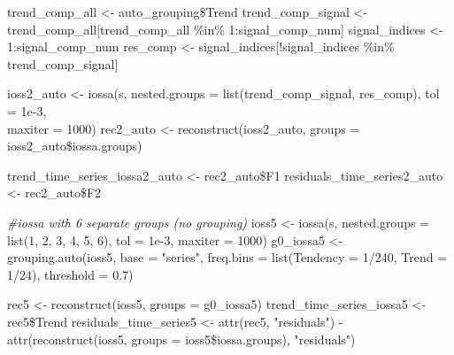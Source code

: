 \documentclass[specialist,
               substylefile = spbu_report.rtx,
               subf,href,colorlinks=true, 12pt]{disser}
\theoremstyle{definition}
\newenvironment{Shaded}{\begin{snugshade}}{\end{snugshade}}
\newcommand{\AttributeTok}[1]{\textcolor[rgb]{0.77,0.63,0.00}{#1}}
\newcommand{\CommentTok}[1]{\textcolor[rgb]{0.56,0.35,0.01}{\textit{#1}}}
\newcommand{\DecValTok}[1]{\textcolor[rgb]{0.00,0.00,0.81}{#1}}
\newcommand{\FloatTok}[1]{\textcolor[rgb]{0.00,0.00,0.81}{#1}}
\newcommand{\FunctionTok}[1]{\textcolor[rgb]{0.00,0.00,0.00}{#1}}
\newcommand{\NormalTok}[1]{#1}
\newcommand{\OtherTok}[1]{\textcolor[rgb]{0.56,0.35,0.01}{#1}}
\newcommand{\SpecialCharTok}[1]{\textcolor[rgb]{0.00,0.00,0.00}{#1}}
\newcommand{\StringTok}[1]{\textcolor[rgb]{0.31,0.60,0.02}{#1}}
\begin{document}
\begin{Shaded}
\begin{Highlighting}[]
\NormalTok{    trend\_comp\_all }\OtherTok{\textless{}{-}}\NormalTok{ auto\_grouping}\SpecialCharTok{\$}\NormalTok{Trend}
\NormalTok{    trend\_comp\_signal }\OtherTok{\textless{}{-}}\NormalTok{ trend\_comp\_all[trend\_comp\_all }\SpecialCharTok{\%in\%} \DecValTok{1}\SpecialCharTok{:}\NormalTok{signal\_comp\_num]}
\NormalTok{    signal\_indices }\OtherTok{\textless{}{-}} \DecValTok{1}\SpecialCharTok{:}\NormalTok{signal\_comp\_num}
\NormalTok{    res\_comp }\OtherTok{\textless{}{-}}\NormalTok{ signal\_indices[}\SpecialCharTok{!}\NormalTok{signal\_indices }\SpecialCharTok{\%in\%}\NormalTok{ trend\_comp\_signal]}
    
\NormalTok{    ioss2\_auto }\OtherTok{\textless{}{-}} \FunctionTok{iossa}\NormalTok{(s, }\AttributeTok{nested.groups =} \FunctionTok{list}\NormalTok{(trend\_comp\_signal, res\_comp), }\AttributeTok{tol =} \FloatTok{1e{-}3}\NormalTok{, }
\\ \AttributeTok{maxiter =} \DecValTok{1000}\NormalTok{)}
\NormalTok{    rec2\_auto }\OtherTok{\textless{}{-}} \FunctionTok{reconstruct}\NormalTok{(ioss2\_auto, }\AttributeTok{groups =}\NormalTok{ ioss2\_auto}\SpecialCharTok{\$}\NormalTok{iossa.groups)}
    
\NormalTok{    trend\_time\_series\_iossa2\_auto }\OtherTok{\textless{}{-}}\NormalTok{ rec2\_auto}\SpecialCharTok{\$}\NormalTok{F1}
\NormalTok{    residuals\_time\_series2\_auto }\OtherTok{\textless{}{-}}\NormalTok{ rec2\_auto}\SpecialCharTok{\$}\NormalTok{F2}
    
    \CommentTok{\#iossa with 6 separate groups (no grouping)}
\NormalTok{    ioss5 }\OtherTok{\textless{}{-}} \FunctionTok{iossa}\NormalTok{(s, }\AttributeTok{nested.groups =} \FunctionTok{list}\NormalTok{(}\DecValTok{1}\NormalTok{, }\DecValTok{2}\NormalTok{, }\DecValTok{3}\NormalTok{, }\DecValTok{4}\NormalTok{, }\DecValTok{5}\NormalTok{, }\DecValTok{6}\NormalTok{), }\AttributeTok{tol =} \FloatTok{1e{-}3}\NormalTok{, }\AttributeTok{maxiter =} \DecValTok{1000}\NormalTok{)}
\NormalTok{    g0\_iossa5 }\OtherTok{\textless{}{-}} \FunctionTok{grouping.auto}\NormalTok{(ioss5, }\AttributeTok{base =} \StringTok{"series"}\NormalTok{, }
                    \AttributeTok{freq.bins =} \FunctionTok{list}\NormalTok{(}\AttributeTok{Tendency =} \DecValTok{1}\SpecialCharTok{/}\DecValTok{240}\NormalTok{, }\AttributeTok{Trend =} \DecValTok{1}\SpecialCharTok{/}\DecValTok{24}\NormalTok{), }
                    \AttributeTok{threshold =} \FloatTok{0.7}\NormalTok{)}
                   
\NormalTok{    rec5 }\OtherTok{\textless{}{-}} \FunctionTok{reconstruct}\NormalTok{(ioss5, }\AttributeTok{groups =}\NormalTok{ g0\_iossa5)}
\NormalTok{    trend\_time\_series\_iossa5 }\OtherTok{\textless{}{-}}\NormalTok{ rec5}\SpecialCharTok{\$}\NormalTok{Trend}
\NormalTok{    residuals\_time\_series5 }\OtherTok{\textless{}{-}} \FunctionTok{attr}\NormalTok{(rec5, }\StringTok{"residuals"}\NormalTok{) }\SpecialCharTok{{-}}
\\ \FunctionTok{attr}\NormalTok{(}\FunctionTok{reconstruct}\NormalTok{(ioss5, }\AttributeTok{groups =}\NormalTok{ ioss5}\SpecialCharTok{\$}\NormalTok{iossa.groups), }\StringTok{"residuals"}\NormalTok{)}
    

\end{Highlighting}
\end{Shaded}
\end{document}
